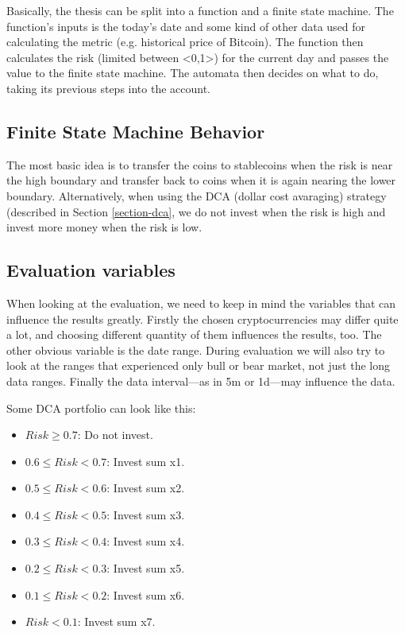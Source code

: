 Basically, the thesis can be split into a function and a finite state machine. The function's inputs is the today's date and some kind of other data used for calculating the metric (e.g. historical price of Bitcoin). The function then calculates the risk (limited between <0,1>) for the current day and passes the value to the finite state machine. The automata then decides on what to do, taking its previous steps into the account.

\subsection*{Finite State Machine Behavior}
The most basic idea is to transfer the coins to stablecoins when the risk is near the high boundary and transfer back to coins when it is again nearing the lower boundary. Alternatively, when using the DCA (dollar cost avaraging) strategy (described in Section \ref{section-dca}, we do not invest when the risk is high and invest more money when the risk is low.

\subsection*{Evaluation variables}
When looking at the evaluation, we need to keep in mind the variables that can influence the results greatly. Firstly the chosen cryptocurrencies may differ quite a lot, and choosing different quantity of them influences the results, too. The other obvious variable is the date range. During evaluation we will also try to look at the ranges that experienced only bull or bear market, not just the long data ranges. Finally the data interval---as in 5m or 1d---may influence the data.

Some DCA portfolio can look like this:
\begin{itemize}
    \item $Risk \ge  0.7$: Do not invest.
    \item $0.6 \le Risk < 0.7$: Invest sum x1.
    \item $0.5 \le Risk < 0.6$: Invest sum x2.
    \item $0.4 \le Risk < 0.5$: Invest sum x3.
    \item $0.3 \le Risk < 0.4$: Invest sum x4.
    \item $0.2 \le Risk < 0.3$: Invest sum x5.
    \item $0.1 \le Risk < 0.2$: Invest sum x6.
    \item $Risk < 0.1$: Invest sum x7.
\end{itemize}

